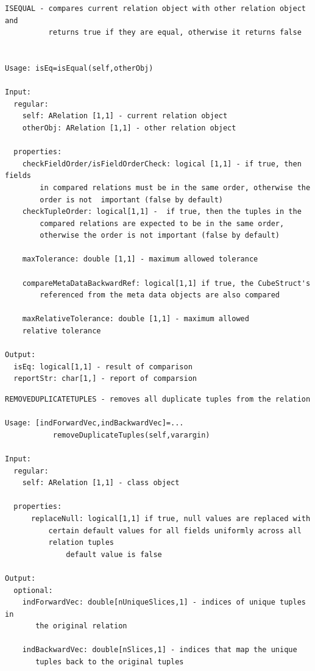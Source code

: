 \documentclass[letterpaper,10pt,english]{sphinxmanual}
\begin{document}
\begin{Verbatim}[commandchars=\\\{\}]
ISEQUAL - compares current relation object with other relation object and
          returns true if they are equal, otherwise it returns false


Usage: isEq=isEqual(self,otherObj)

Input:
  regular:
    self: ARelation [1,1] - current relation object
    otherObj: ARelation [1,1] - other relation object

  properties:
    checkFieldOrder/isFieldOrderCheck: logical [1,1] - if true, then fields
        in compared relations must be in the same order, otherwise the
        order is not  important (false by default)
    checkTupleOrder: logical[1,1] -  if true, then the tuples in the
        compared relations are expected to be in the same order,
        otherwise the order is not important (false by default)

    maxTolerance: double [1,1] - maximum allowed tolerance

    compareMetaDataBackwardRef: logical[1,1] if true, the CubeStruct's
        referenced from the meta data objects are also compared

    maxRelativeTolerance: double [1,1] - maximum allowed
    relative tolerance

Output:
  isEq: logical[1,1] - result of comparison
  reportStr: char[1,] - report of comparsion
\end{Verbatim}

\begin{Verbatim}[commandchars=\\\{\}]
REMOVEDUPLICATETUPLES - removes all duplicate tuples from the relation

Usage: [indForwardVec,indBackwardVec]=...
           removeDuplicateTuples(self,varargin)

Input:
  regular:
    self: ARelation [1,1] - class object

  properties:
      replaceNull: logical[1,1] if true, null values are replaced with
          certain default values for all fields uniformly across all
          relation tuples
              default value is false

Output:
  optional:
    indForwardVec: double[nUniqueSlices,1] - indices of unique tuples in
       the original relation

    indBackwardVec: double[nSlices,1] - indices that map the unique
       tuples back to the original tuples
\end{Verbatim}
\end{document}
